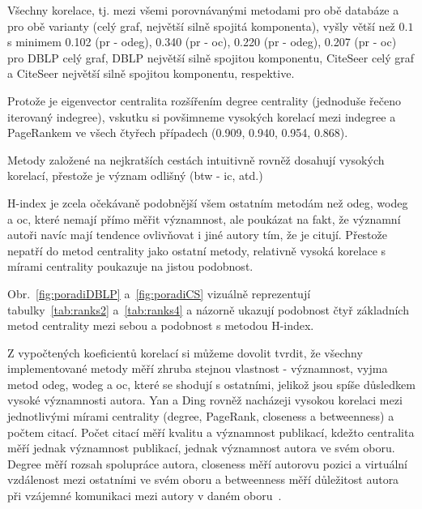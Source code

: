 \documentclass{bakalarka}
\begin{document}
Všechny korelace, tj. mezi všemi porovnávanými metodami pro obě databáze a pro
obě varianty (celý graf, největší silně spojitá komponenta), vyšly větší než
$0.1$ s minimem 0.102 (pr - odeg), 0.340 (pr - oc), 0.220 (pr - odeg), 0.207
(pr - oc) pro DBLP celý graf, DBLP největší silně spojitou komponentu, CiteSeer
celý graf a CiteSeer největší silně spojitou komponentu, respektive. 


Protože je eigenvector centralita rozšířením degree centrality (jednoduše
řečeno iterovaný indegree), vskutku si povšimneme vysokých korelací mezi
indegree a PageRankem ve všech čtyřech případech (0.909, 0.940, 0.954, 0.868).

Metody založené na nejkratších cestách intuitivně rovněž dosahují vysokých
korelací, přestože je význam odlišný (btw - ic, atd.)

H-index je zcela očekávaně podobnější všem ostatním metodám než odeg, wodeg a
oc, které nemají přímo měřit významnost, ale poukázat na fakt, že významní
autoři navíc mají tendence ovlivňovat i jiné autory tím, že je citují. Přestože
nepatří do metod centrality jako ostatní metody, relativně vysoká korelace s
mírami centrality poukazuje na jistou podobnost.

Obr.~\ref{fig:poradiDBLP} a~\ref{fig:poradiCS} vizuálně reprezentují
tabulky~\ref{tab:ranks2} a~\ref{tab:ranks4} a názorně ukazují podobnost čtyř
základních metod centrality mezi sebou a podobnost s metodou H-index.


Z vypočtených koeficientů korelací si můžeme dovolit tvrdit, že všechny
implementované metody měří zhruba stejnou vlastnost - významnost, vyjma metod
odeg, wodeg a oc, které se shodují s ostatními, jelikož jsou spíše důsledkem
vysoké významnosti autora. 
Yan a Ding rovněž nacházeji vysokou korelaci mezi jednotlivými mírami
centrality (degree, PageRank, closeness a betweenness) a počtem citací. Počet
citací měří kvalitu a významnost publikací, kdežto centralita měří jednak
významnost publikací, jednak významnost autora ve svém oboru. Degree měří
rozsah spolupráce autora, closeness měří autorovu pozici a virtuální vzdálenost
mezi ostatními ve svém oboru a betweenness měří důležitost autora při vzájemné
komunikaci mezi autory v daném oboru~\citep{yanding2009}.

\end{document}
